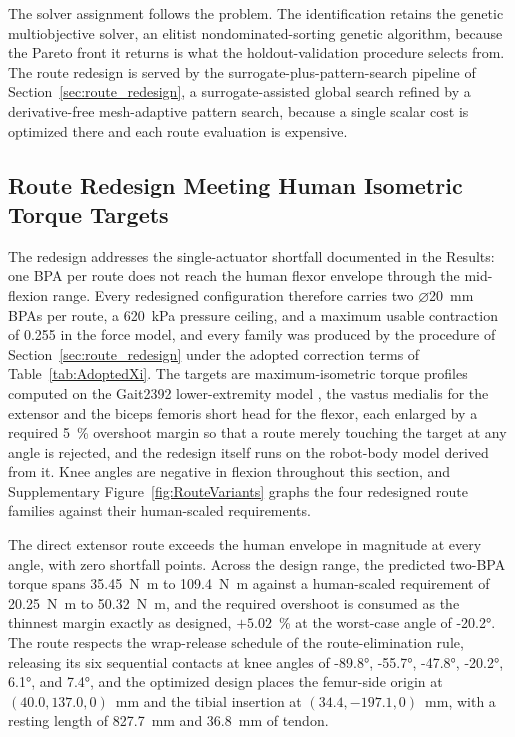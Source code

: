 \documentclass[utf8]{FrontiersinHarvard} %
\begin{document}
The solver assignment follows the problem. The identification retains the genetic multiobjective solver, an elitist nondominated-sorting genetic algorithm, because the Pareto front it returns is what the holdout-validation procedure selects from. The route redesign is served by the surrogate-plus-pattern-search pipeline of Section~\ref{sec:route_redesign}, a surrogate-assisted global search refined by a derivative-free mesh-adaptive pattern search, because a single scalar cost is optimized there and each route evaluation is expensive.

\subsection{Route Redesign Meeting Human Isometric Torque Targets}\label{sec:route_redesign_results}

The redesign addresses the single-actuator shortfall documented in the Results: one BPA per route does not reach the human flexor envelope through the mid-flexion range. Every redesigned configuration therefore carries two $\diameter$\qty{20}{\mm} BPAs per route, a \qty{620}{\kPa} pressure ceiling, and a maximum usable contraction of 0.255 in the force model, and every family was produced by the procedure of Section~\ref{sec:route_redesign} under the adopted correction terms of Table~\ref{tab:AdoptedXi}. The targets are maximum-isometric torque profiles computed on the Gait2392 lower-extremity model \citep{delp_opensim_2007, seth_opensim_2018}, the vastus medialis for the extensor and the biceps femoris short head for the flexor, each enlarged by a required \qty{5}{\percent} overshoot margin so that a route merely touching the target at any angle is rejected, and the redesign itself runs on the robot-body model derived from it. Knee angles are negative in flexion throughout this section, and Supplementary Figure~\ref{fig:RouteVariants} graphs the four redesigned route families against their human-scaled requirements.

The direct extensor route exceeds the human envelope in magnitude at every angle, with zero shortfall points. Across the design range, the predicted two-BPA torque spans \qty{35.45}{\newton\meter} to \qty{109.4}{\newton\meter} against a human-scaled requirement of \qty{20.25}{\newton\meter} to \qty{50.32}{\newton\meter}, and the required overshoot is consumed as the thinnest margin exactly as designed, $+5.02$~\% at the worst-case angle of \ang{-20.2}. The route respects the wrap-release schedule of the route-elimination rule, releasing its six sequential contacts at knee angles of \ang{-89.8}, \ang{-55.7}, \ang{-47.8}, \ang{-20.2}, \ang{6.1}, and \ang{7.4}, and the optimized design places the femur-side origin at $(40.0, 137.0, 0)$~mm and the tibial insertion at $(34.4, -197.1, 0)$~mm, with a resting length of \qty{827.7}{\mm} and \qty{36.8}{\mm} of tendon.
\end{document}
